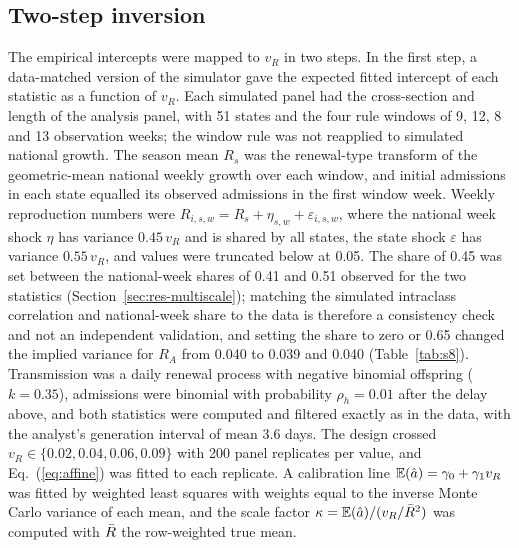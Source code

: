 \subsection{Two-step inversion}
\label{sec:meth-inversion}

The empirical intercepts were mapped to $v_R$ in two steps. In the first step, a data-matched version of the simulator gave the expected fitted intercept of each statistic as a function of $v_R$. Each simulated panel had the cross-section and length of the analysis panel, with 51 states and the four rule windows of 9, 12, 8 and 13 observation weeks; the window rule was not reapplied to simulated national growth. The season mean $R_s$ was the renewal-type transform of the geometric-mean national weekly growth over each window, and initial admissions in each state equalled its observed admissions in the first window week. Weekly reproduction numbers were $R_{i,s,w}=R_s+\eta_{s,w}+\varepsilon_{i,s,w}$, where the national week shock $\eta$ has variance $0.45\,v_R$ and is shared by all states, the state shock $\varepsilon$ has variance $0.55\,v_R$, and values were truncated below at 0.05. The share of 0.45 was set between the national-week shares of 0.41 and 0.51 observed for the two statistics (Section~\ref{sec:res-multiscale}); matching the simulated intraclass correlation and national-week share to the data is therefore a consistency check and not an independent validation, and setting the share to zero or 0.65 changed the implied variance for $R_A$ from 0.040 to 0.039 and 0.040 (Table~\ref{tab:s8}). Transmission was a daily renewal process with negative binomial offspring ($k=0.35$), admissions were binomial with probability $\rho_h=0.01$ after the delay above, and both statistics were computed and filtered exactly as in the data, with the analyst's generation interval of mean 3.6 days. The design crossed $v_R\in\{0.02,0.04,0.06,0.09\}$ with 200 panel replicates per value, and Eq.~(\ref{eq:affine}) was fitted to each replicate. A calibration line $\mathbb{E}(\hat{a})=\gamma_0+\gamma_1v_R$ was fitted by weighted least squares with weights equal to the inverse Monte Carlo variance of each mean, and the scale factor $\kappa=\mathbb{E}(\hat{a})/(v_R/\bar{R}^2)$ was computed with $\bar{R}$ the row-weighted true mean.

